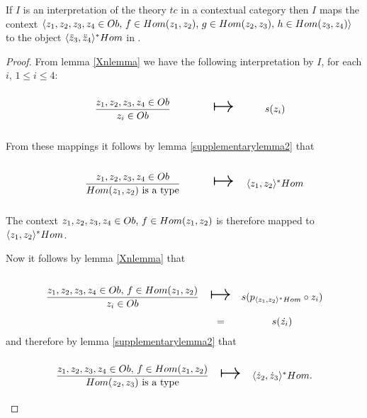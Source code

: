 \begin{lemma}
If $I$ is an interpretation of the theory $tc$ in a contextual category \catcw then
$I$ maps the context $\langle z_1,z_2,z_3,z_4 \in Ob,\,f \in Hom(z_1,z_2),\,g \in Hom(z_2,z_3),\,h \in Hom(z_3,z_4)\rangle$ to the object $\langle\ddot z_3,\ddot z_4\rangle^*Hom$ in \catc.
\end{lemma}
\begin{proof}
\newcommand {\forceSOURCEwidth}{\rule{5cm}{0pt}}  %
\newcommand {\forceTARGETwidth}{\rule{2.2cm}{0pt}}

From lemma \ref{Xnlemma} we have the following interpretation by $I$, for each $i$, $1 \leq i \leq 4$:
\begin{equation*}
\begin{array}{c c c}
\forceSOURCEwidth & & \forceTARGETwidth \\ [-0.1cm]
\gatdisplayrule{\zOOOO}{\ofT{z_i}{Ob}} & \Imapsto & s(z_i) 
\end{array}
\end{equation*}

From these mappings it follows by lemma \ref{supplementarylemma2} that 

\begin{equation*}
\begin{array}{c c c}
\forceSOURCEwidth & & \forceTARGETwidth \\ [-0.1cm]
\gatdisplayrule{\zOOOO}{\isT{Hom(z_1,z_2)}} & \Imapsto & \associativitypremisepoppopmapped 
\end{array}
\end{equation*}

The context $z_1,z_2,z_3,z_4 \in Ob,\,f \in Hom(z_1,z_2)$ is therefore mapped to $\langle z_1,z_2\rangle^*Hom$.

Now it follows by lemma \ref{Xnlemma} that 

\begin{equation*}
\begin{array}{c c c}
\forceSOURCEwidth & & \forceTARGETwidth \\ [-0.1cm]
\gatdisplayrule{\associativitypremisepoppop}{\ofT{z_i}{Ob}} & \Imapsto & s(p_{\associativitypremisepoppopmapped} \circ z_i) \\
                                                            & = & s(\dot{z_i})
\end{array}
\end{equation*}
and therefore by  lemma \ref{supplementarylemma2} that 
\begin{equation*}
\begin{array}{c c c}
\forceSOURCEwidth & & \forceTARGETwidth \\ [-0.1cm]
\gatdisplayrule{\associativitypremisepoppop}{\isT{Hom(z_2,z_3)}} & \Imapsto & \associativitypremisepopmapped.
\end{array}
\end{equation*}


\end{proof}
